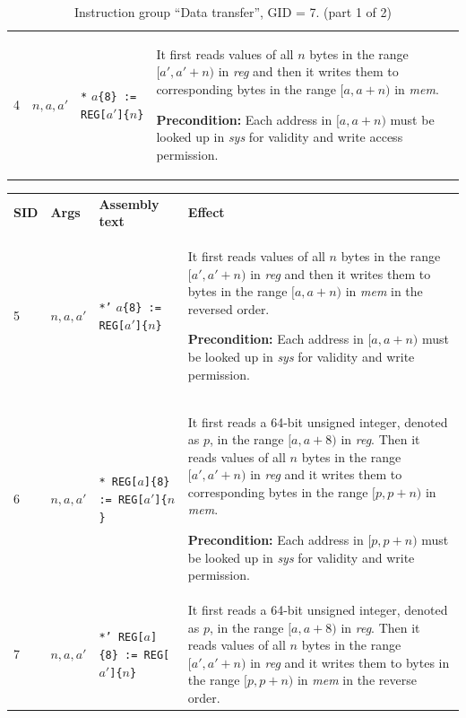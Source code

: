\documentclass[10pt,twocolumn]{article}
\begin{document}
\begin{table}[!h]
\begin{center}
\begin{tabular}{lp{1.2cm}p{5.5cm}p{7.5cm}}
4 & $ n,a,a' $ %
& \texttt{*} $ a $\texttt{\{8\} :=  REG[}$ a' $\texttt{]\{}$ n
$\texttt{\}} %
& It first reads values of all $ n $ bytes in the range $ [a',a'+n) $ in
\textit{reg} and then it writes them to corresponding bytes in the range $
[a,a+n) $ in \textit{mem}.

\textbf{Precondition:} Each address in $ [a,a+n) $ must be looked up in
\textit{sys} for validity and write access permission. \\

\end{tabular}
\end{center}
\caption{Instruction group ``Data transfer'', GID = 7. (part 1 of 2)}
\label{tab:igroup:datatransfer}
\end{table}

\begin{table}[!h]
\vspace{-1cm}
\begin{center}
\def\arraystretch{1.5}
\begin{tabular}{lp{1.2cm}p{5.5cm}p{7.5cm}}
\textbf{SID} & \textbf{Args} & \textbf{Assembly text} & \textbf{Effect}
\\

5 & $ n,a,a' $ %
& \texttt{*'} $ a $\texttt{\{8\} :=  REG[}$ a' $\texttt{]\{}$ n
$\texttt{\}} %
& It first reads values of all $ n $ bytes in the range $ [a',a'+n) $ in
\textit{reg} and then it writes them to bytes in the range $ [a,a+n) $ in
\textit{mem} in the reversed order.

\textbf{Precondition:} Each address in $ [a,a+n) $ must be looked up in
\textit{sys} for validity and write permission. \\

6 & $ n,a,a' $ %
& \texttt{* REG[}$ a $\texttt{]\{8\} := REG[}$ a' $\texttt{]\{}$ n
$\texttt{\}} %
& It first reads a 64-bit unsigned integer, denoted as $ p $, in the range $
[a,a+8) $ in \textit{reg}. Then it reads values of all $ n $ bytes in the range
$ [a',a'+n) $ in \textit{reg} and it writes them to corresponding bytes in the
range $ [p,p+n) $ in \textit{mem}.

\textbf{Precondition:} Each address in $ [p,p+n) $ must be looked up in
\textit{sys} for validity and write permission. \\

7 & $ n,a,a' $ %
& \texttt{*' REG[}$ a $\texttt{]\{8\} := REG[}$ a' $\texttt{]\{}$ n
$\texttt{\}} %
& It first reads a 64-bit unsigned integer, denoted as $ p $, in the range $
[a,a+8) $ in \textit{reg}. Then it reads values of all $ n $ bytes in the range
$ [a',a'+n) $ in \textit{reg} and it writes them to bytes in the range $ [p,p+n)
$ in \textit{mem} in the reverse order.


\end{tabular}
\end{center}
\end{table}
\end{document}
